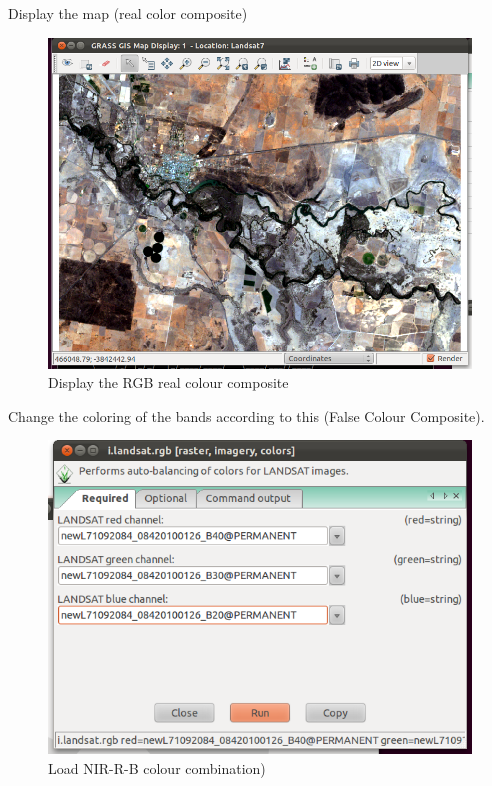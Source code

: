 Display the map (real color composite)

\begin{figure}[htbp]
   \centering
   \includegraphics[scale=0.35]{grass_rs005.png}
   \caption{Display the RGB real colour composite}
   \label{fig:grass_rs005}
\end{figure}

Change the coloring of the bands according to this (False Colour Composite).

\begin{figure}[htbp]
   \centering
   \includegraphics[scale=0.35]{grass_rs006.png}
   \caption{Load NIR-R-B colour combination)}
   \label{fig:grass_rs006}
\end{figure}


